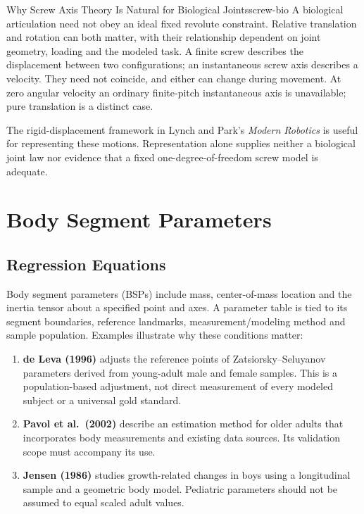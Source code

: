 \begin{comparison}{Why Screw Axis Theory Is Natural for Biological Joints}{screw-bio}
  A biological articulation need not obey an ideal fixed revolute constraint.
  Relative translation and rotation can both matter, with their relationship
  dependent on joint geometry, loading and the modeled task. A finite screw
  describes the displacement between two configurations; an instantaneous
  screw axis describes a velocity. They need not coincide, and either can
  change during movement. At zero angular velocity an ordinary finite-pitch
  instantaneous axis is unavailable; pure translation is a distinct case.

  The rigid-displacement framework in Lynch and Park's \emph{Modern Robotics}
  \cite{ModernRoboticsRigidExpReview} is useful for representing these motions.
  Representation alone supplies neither a biological joint law nor evidence
  that a fixed one-degree-of-freedom screw model is adequate.
\end{comparison}

\section{Body Segment Parameters}

\subsection{Regression Equations}

Body segment parameters (BSPs) include mass, center-of-mass location and the
inertia tensor about a specified point and axes. A parameter table is tied to
its segment boundaries, reference landmarks, measurement/modeling method and
sample population. Examples illustrate why these conditions matter:
\begin{enumerate}
  \item \textbf{de Leva (1996)} \cite{deLeva1996} adjusts the reference points
        of Zatsiorsky--Seluyanov parameters derived from young-adult male and
        female samples. This is a population-based adjustment, not direct
        measurement of every modeled subject or a universal gold standard.
  \item \textbf{Pavol et al.\ (2002)} \cite{Pavol2002BSPReview} describe an
        estimation method for older adults that incorporates body measurements
        and existing data sources. Its validation scope must accompany its use.
  \item \textbf{Jensen (1986)} \cite{Jensen1986BSPReview} studies growth-related
        changes in boys using a longitudinal sample and a geometric body model.
        Pediatric parameters should not be assumed to equal scaled adult values.
\end{enumerate}

